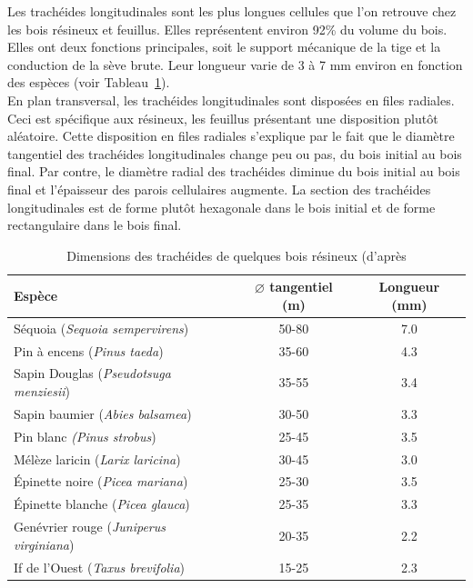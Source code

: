 Les trachéides longitudinales sont les plus longues cellules que l'on retrouve chez les bois résineux et feuillus. Elles représentent environ 92\% du volume du bois. Elles ont deux fonctions principales, soit le support mécanique de la tige et la conduction de la sève brute. Leur longueur varie de 3 à 7 mm environ en fonction des espèces (voir Tableau~\ref{tab:diam_long}).\\

En plan transversal, les trachéides longitudinales sont disposées en files radiales. Ceci est spécifique aux résineux, les feuillus présentant une disposition plutôt aléatoire. Cette disposition en files radiales s'explique par le fait que le diamètre tangentiel des trachéides longitudinales change peu ou pas, du bois initial au bois final. Par contre, le diamètre radial des trachéides diminue du bois initial au bois final et l'épaisseur des parois cellulaires augmente. La section des trachéides longitudinales est de forme plutôt hexagonale dans le bois initial et de forme rectangulaire dans le bois final.

\begin{table}[ht]
\centering
	
	\begin{tabular}{l c c}
	\hline
	\bf Espèce	& \bf $\varnothing$ tangentiel (\micro m)& \bf Longueur (mm) \\
	\hline\hline
	Séquoia (\textit{Sequoia sempervirens}) & 50-80 & 7.0 \\
	Pin à encens (\textit{Pinus taeda})  &  35-60 &  4.3\\
	Sapin Douglas (\textit{Pseudotsuga menziesii})  & 35-55 & 3.4 \\
	Sapin baumier (\textit{Abies balsamea})  & 30-50 & 3.3 \\
	Pin blanc \textit{(Pinus strobus})  & 25-45 &  3.5 \\
	Mélèze laricin (\textit{Larix laricina})  & 30-45 & 3.0 \\
	Épinette noire (\textit{Picea mariana})  & 25-30 & 3.5 \\
	Épinette blanche (\textit{Picea glauca})  & 25-35 & 3.3 \\
	Genévrier rouge (\textit{Juniperus virginiana})  & 20-35 & 2.2 \\
	If de l'Ouest (\textit{Taxus brevifolia}) & 15-25 &  2.3\\
	\hline
	\end{tabular}

\caption{\label{tab:diam_long} Dimensions des trachéides de quelques bois résineux (d'après \cite{panshin1980textbook}}
\end{table}

